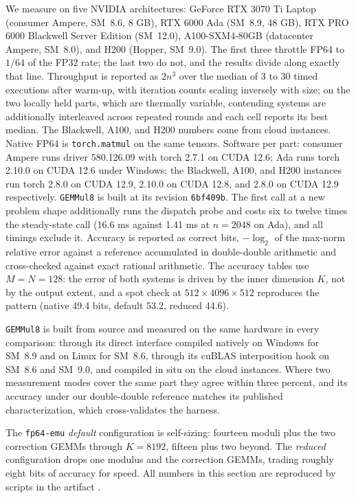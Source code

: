 \documentclass[11pt]{amsart}
\theoremstyle{plain}
\theoremstyle{definition}
\newcommand{\code}[1]{\texttt{#1}}
\newcommand{\fpemu}{\code{fp64-emu}}
\newcommand{\gemmul}{\code{GEMMul8}}
\begin{document}
We measure on five NVIDIA architectures: GeForce RTX 3070 Ti Laptop
(consumer Ampere, SM~8.6, 8 GB), RTX 6000 Ada (SM~8.9, 48 GB), RTX PRO
6000 Blackwell Server Edition (SM~12.0), A100-SXM4-80GB (datacenter
Ampere, SM~8.0), and H200 (Hopper, SM~9.0). The first three throttle FP64
to $1/64$ of the FP32 rate; the last two do not, and the results divide
along exactly that line. Throughput is reported as $2n^3$ over the median
of 3 to 30 timed executions after warm-up, with iteration counts scaling
inversely with size; on the two locally held parts, which are thermally
variable, contending systems are additionally interleaved across repeated
rounds and each cell reports its best median. The Blackwell, A100, and
H200 numbers come from cloud instances. Native FP64 is
\code{torch.matmul} on the same tensors. Software per part: consumer
Ampere runs driver 580.126.09 with torch 2.7.1 on CUDA 12.6; Ada runs
torch 2.10.0 on CUDA 12.6 under Windows; the Blackwell, A100, and H200
instances run torch 2.8.0 on CUDA 12.9, 2.10.0 on CUDA 12.8, and 2.8.0
on CUDA 12.9 respectively. \gemmul{} is built at its revision
\code{6bf409b}. The first call at a new problem
shape additionally runs the dispatch probe and costs six to twelve times
the steady-state call (16.6 ms against 1.41 ms at $n = 2048$ on Ada), and
all timings exclude it. Accuracy is reported as correct bits, $-\log_2$
of the max-norm relative error against a reference accumulated in
double-double arithmetic and cross-checked against exact rational
arithmetic. The accuracy tables use $M = N = 128$: the error of both
systems is driven by the inner dimension $K$, not by the output extent,
and a spot check at $512 \times 4096 \times 512$ reproduces the pattern
(native 49.4 bits, default 53.2, reduced 44.6).

\gemmul{} is built from source and measured on the same hardware in every
comparison: through its direct interface compiled natively on Windows for
SM~8.9 and on Linux for SM~8.6, through its cuBLAS interposition hook on
SM~8.6 and SM~9.0, and compiled in situ on the cloud instances. Where two
measurement modes cover the same part they agree within three percent,
and its accuracy under our double-double reference matches its published
characterization, which cross-validates the harness.

The \fpemu{} \emph{default} configuration is self-sizing: fourteen moduli
plus the two correction GEMMs through $K = 8192$, fifteen plus two beyond.
The \emph{reduced} configuration drops one modulus and the correction
GEMMs, trading roughly eight bits of accuracy for speed. All numbers in
this section are reproduced by scripts in the artifact \cite{fpemurepo}.
\end{document}
